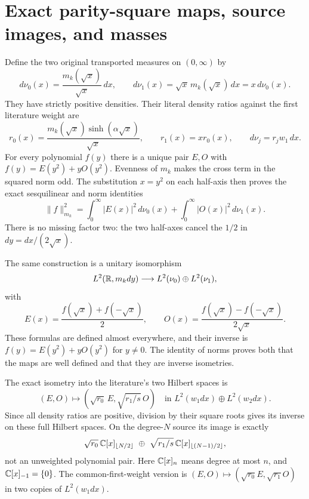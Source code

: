 \documentclass[11pt]{article}
\begin{document}
\section{Exact parity-square maps, source images, and masses}

Define the two original transported measures on $(0,\infty)$ by
\begin{equation}\label{parity:eq:nu}
 d\nu_0(x)=\frac{m_k(\sqrt x)}{\sqrt x}\,dx,
 \qquad d\nu_1(x)=\sqrt x\,m_k(\sqrt x)\,dx=x\,d\nu_0(x).
\end{equation}
They have strictly positive densities. Their literal density
ratios against the first literature weight are
\begin{equation}\label{parity:eq:ratios}
 r_0(x)=\frac{m_k(\sqrt x)\sinh(\alpha\sqrt x)}{\sqrt x},
 \qquad r_1(x)=x r_0(x),\qquad d\nu_j=r_jw_1\,dx.
\end{equation}
For every polynomial $f(y)$ there is a unique pair $E,O$ with
$f(y)=E(y^2)+yO(y^2)$. Evenness of $m_k$ makes the cross term in
the squared norm odd. The substitution $x=y^2$ on each half-axis
then proves the exact sesquilinear and norm identities
\begin{equation}\label{parity:eq:parity-norm}
 \|f\|_{m_k}^2=\int_0^\infty|E(x)|^2\,d\nu_0(x)
                    +\int_0^\infty|O(x)|^2\,d\nu_1(x).
\end{equation}
There is no missing factor two: the two half-axes cancel the
$1/2$ in $dy=dx/(2\sqrt x)$.

The same construction is a unitary isomorphism
\[
 L^2(\mathbb R,m_kdy)\longrightarrow L^2(\nu_0)\oplus L^2(\nu_1),
\]
with
\[
 E(x)=\frac{f(\sqrt x)+f(-\sqrt x)}2,\qquad
 O(x)=\frac{f(\sqrt x)-f(-\sqrt x)}{2\sqrt x}.
\]
These formulas are defined almost everywhere, and their inverse
is $f(y)=E(y^2)+yO(y^2)$ for $y\ne0$. The identity of norms proves
both that the maps are well defined and that they are inverse
isometries.

The exact isometry into the literature's two Hilbert spaces is
\begin{equation}\label{parity:eq:literature-isometry}
 (E,O)\longmapsto
       \left(\sqrt{r_0}\,E,\sqrt{r_1/s}\,O\right)
 \quad\text{in }L^2(w_1dx)\oplus L^2(w_2dx).
\end{equation}
Since all density ratios are positive, division by their square
roots gives its inverse on these full Hilbert spaces. On the
degree-$N$ source its image is exactly
\[
 \sqrt{r_0}\,\parityPol_{\lfloor N/2\rfloor}
       \ \oplus\ \sqrt{r_1/s}\,\parityPol_{\lfloor(N-1)/2\rfloor},
\]
not an unweighted polynomial pair. Here $\mathbb C[x]_n$ means degree at
most $n$, and $\mathbb C[x]_{-1}=\{0\}$. The common-first-weight version
is $(E,O)\mapsto(\sqrt{r_0}E,\sqrt{r_1}O)$ in two copies of
$L^2(w_1dx)$.
\end{document}
